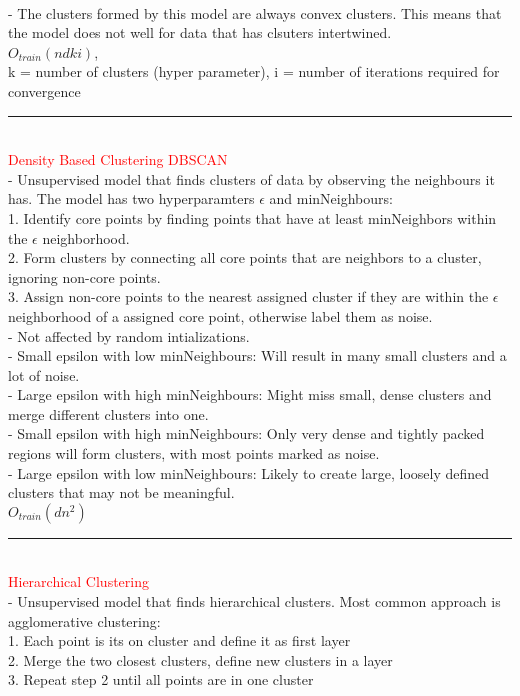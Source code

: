 \documentclass[8pt]{extarticle}
\begin{document}
\begin{multicols*}{2}
\\
- The clusters formed by this model are always convex clusters. This means that the model does not well for data that has clsuters intertwined. 
\\
$O_{train}(ndki)$, 
\\
k = number of clusters (hyper parameter), i = number of iterations required for convergence
\\
\rule{\linewidth}{0.5mm} 
\\
\textcolor{red}{Density Based Clustering DBSCAN}
\\
- Unsupervised model that finds clusters of data by observing the neighbours it has. The model has two hyperparamters $\epsilon$ and minNeighbours:
\\
1. Identify core points by finding points that have at least minNeighbors within the $\epsilon$ neighborhood.
\\
2. Form clusters by connecting all core points that are neighbors to a cluster, ignoring non-core points.
\\
3. Assign non-core points to the nearest assigned cluster if they are within the $\epsilon$ neighborhood of a assigned core point, otherwise label them as noise.
\\
- Not affected by random intializations.
\\
- Small epsilon with low minNeighbours: Will result in many small clusters and a lot of noise.
\\
- Large epsilon with high minNeighbours: Might miss small, dense clusters and merge different clusters into one.
\\
- Small epsilon with high minNeighbours: Only very dense and tightly packed regions will form clusters, with most points marked as noise.
\\
- Large epsilon with low minNeighbours: Likely to create large, loosely defined clusters that may not be meaningful.  
\\
$O_{train}(dn^2)$
\\
\rule{\linewidth}{0.5mm} 
\\
\textcolor{red}{Hierarchical Clustering}
\\
- Unsupervised model that finds hierarchical clusters. Most common approach is agglomerative clustering:
\\
1. Each point is its on cluster and define it as first layer
\\
2. Merge the two closest clusters, define new clusters in a layer
\\
3. Repeat step 2 until all points are in one cluster

\end{multicols*}
\end{document}

